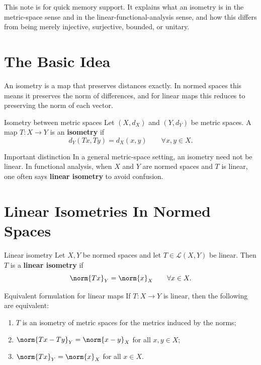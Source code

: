 \documentclass[11pt]{article}
\begin{document}

\vspace{0.8em}

\begin{focusbox}
This note is for quick memory support. It explains what an isometry is in the metric-space sense and in the linear-functional-analysis sense, and how this differs from being merely injective, surjective, bounded, or unitary.
\end{focusbox}

\tableofcontents

\section{The Basic Idea}

An isometry is a map that preserves distances exactly. In normed spaces this means it preserves the norm of differences, and for linear maps this reduces to preserving the norm of each vector.

\begin{defbox}{Isometry between metric spaces}
Let $(X,d_X)$ and $(Y,d_Y)$ be metric spaces. A map $T:X\to Y$ is an \textbf{isometry} if
\[
d_Y(Tx,Ty)=d_X(x,y)
\qquad \forall x,y\in X.
\]
\end{defbox}

\begin{warningbox}{Important distinction}
In a general metric-space setting, an isometry need not be linear. In functional analysis, when $X$ and $Y$ are normed spaces and $T$ is linear, one often says \textbf{linear isometry} to avoid confusion.
\end{warningbox}

\section{Linear Isometries In Normed Spaces}

\begin{defbox}{Linear isometry}
Let $X,Y$ be normed spaces and let $T\in\mathcal L(X,Y)$ be linear. Then $T$ is a \textbf{linear isometry} if
\[
\norm{Tx}_Y=\norm{x}_X
\qquad \forall x\in X.
\]
\end{defbox}

\begin{thmbox}{Equivalent formulation for linear maps}
If $T:X\to Y$ is linear, then the following are equivalent:
\begin{enumerate}
\item $T$ is an isometry of metric spaces for the metrics induced by the norms;
\item $\norm{Tx-Ty}_Y=\norm{x-y}_X$ for all $x,y\in X$;
\item $\norm{Tx}_Y=\norm{x}_X$ for all $x\in X$.
\end{enumerate}
\end{thmbox}
\end{document}

